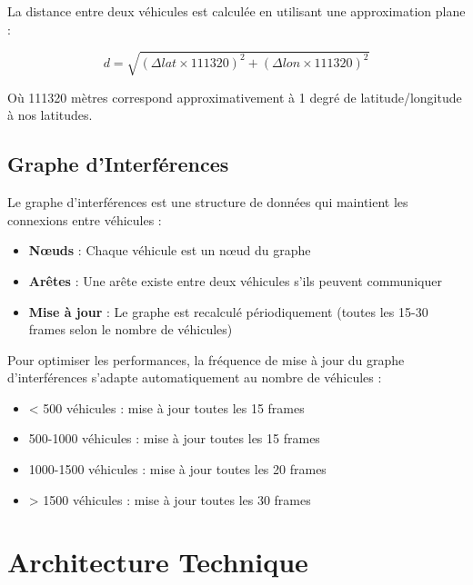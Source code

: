\documentclass[12pt,a4paper]{article}
\begin{document}
La distance entre deux véhicules est calculée en utilisant une approximation plane :

\begin{equation}
d = \sqrt{(\Delta lat \times 111320)^2 + (\Delta lon \times 111320)^2}
\end{equation}

Où 111320 mètres correspond approximativement à 1 degré de latitude/longitude à nos latitudes.

\subsection{Graphe d'Interférences}

Le graphe d'interférences est une structure de données qui maintient les connexions entre véhicules :

\begin{itemize}
    \item \textbf{Nœuds} : Chaque véhicule est un nœud du graphe
    \item \textbf{Arêtes} : Une arête existe entre deux véhicules s'ils peuvent communiquer
    \item \textbf{Mise à jour} : Le graphe est recalculé périodiquement (toutes les 15-30 frames selon le nombre de véhicules)
\end{itemize}

\begin{notebox}
Pour optimiser les performances, la fréquence de mise à jour du graphe d'interférences s'adapte automatiquement au nombre de véhicules :
\begin{itemize}
    \item < 500 véhicules : mise à jour toutes les 15 frames
    \item 500-1000 véhicules : mise à jour toutes les 15 frames
    \item 1000-1500 véhicules : mise à jour toutes les 20 frames
    \item > 1500 véhicules : mise à jour toutes les 30 frames
\end{itemize}
\end{notebox}

\section{Architecture Technique}
\end{document}
